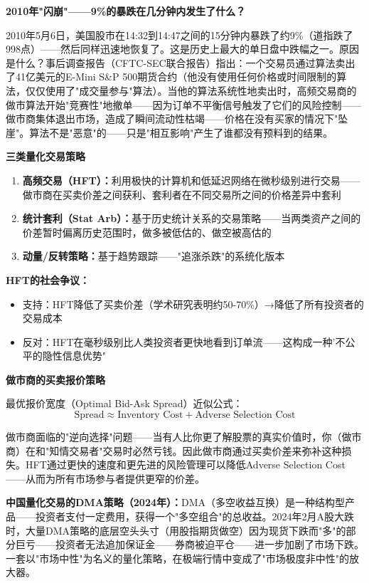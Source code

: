 \documentclass[a4paper,11pt]{ctexbook}
\begin{document}
\begin{scenario}
\textbf{2010年"闪崩"——9\%的暴跌在几分钟内发生了什么？}

2010年5月6日，美国股市在14:32到14:47之间的15分钟内暴跌了约9\%（道指跌了998点）——然后同样迅速地恢复了。这是历史上最大的单日盘中跌幅之一。原因是什么？事后调查报告（CFTC-SEC联合报告）指出：一个交易员通过算法卖出了41亿美元的E-Mini S\&P 500期货合约（他没有使用任何价格或时间限制的算法，仅仅使用了"成交量参与"算法）。当他的算法系统性地卖出时，高频交易商的做市算法开始"竞赛性"地撤单——因为订单不平衡信号触发了它们的风险控制——做市商集体退出市场，造成了瞬间流动性枯竭——价格在没有买家的情况下"坠崖"。算法不是"恶意"的——只是"相互影响"产生了谁都没有预料到的结果。
\end{scenario}

\begin{qualitative}
\textbf{三类量化交易策略}

\begin{enumerate}
  \item \textbf{高频交易（HFT）：}利用极快的计算机和低延迟网络在微秒级别进行交易——做市商在买卖价差之间获利、套利者在不同交易所之间的价格差异中套利
  \item \textbf{统计套利（Stat Arb）：}基于历史统计关系的交易策略——当两类资产之间的价差暂时偏离历史范围时，做多被低估的、做空被高估的
  \item \textbf{动量/反转策略：}基于趋势跟踪——"追涨杀跌"的系统化版本
\end{enumerate}

\textbf{HFT的社会争议：}
\begin{itemize}
  \item 支持：HFT降低了买卖价差（学术研究表明约50-70\%）→降低了所有投资者的交易成本
  \item 反对：HFT在毫秒级别比人类投资者更快地看到订单流——这构成一种'不公平的隐性信息优势"
\end{itemize}
\end{qualitative}

\begin{quantitative}
\textbf{做市商的买卖报价策略}

最优报价宽度（Optimal Bid-Ask Spread）近似公式：
\[
\text{Spread} \approx \text{Inventory Cost} + \text{Adverse Selection Cost}
\]

做市商面临的"逆向选择"问题——当有人比你更了解股票的真实价值时，你（做市商）在和"知情交易者"交易时必然亏钱。因此做市商通过买卖价差来弥补这种损失。HFT通过更快的速度和更先进的风险管理可以降低Adverse Selection Cost——从而为所有市场参与者提供更窄的价差。

\textbf{中国量化交易的DMA策略（2024年）：}DMA（多空收益互换）是一种结构型产品——投资者支付一定费用，获得一个"多空组合"的总收益。2024年2月A股大跌时，大量DMA策略的底层空头头寸（用股指期货做空）因为现货下跌而"多"的部分巨亏——投资者无法追加保证金——券商被迫平仓——进一步加剧了市场下跌。一套以"市场中性"为名义的量化策略，在极端行情中变成了"市场极度非中性"的放大器。
\end{quantitative}
\end{document}
